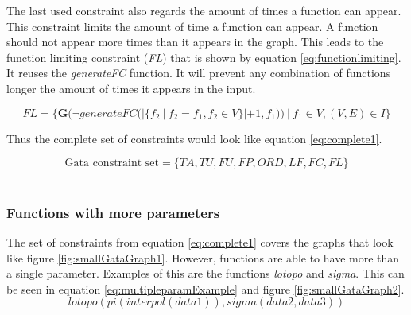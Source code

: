 \documentclass{article}
\begin{document}
The last used constraint also regards the amount of times a function can appear. This constraint limits the amount of time a function can appear. A function should not appear more times than it appears in the graph. This leads to the function limiting constraint (\textit{FL}) that is shown by equation \ref{eq:functionlimiting}. It reuses the \textit{generateFC} function. It will prevent any combination of functions longer the amount of times it appears in the input.

\begin{equation}
    FL = \{ \textbf{G}( \neg  generateFC(|\{ f_2\ |\ f_2 = f_1, f_2 \in V \}| +1, f_1))\ |\ f_1 \in V, (V,E) \in  I \} \label{eq:functionlimiting}
\end{equation}


Thus the complete set of constraints would look like equation \ref{eq:complete1}.

\begin{equation}
    \text{Gata constraint set}= \{TA, TU, FU, FP, ORD, LF, FC,FL\} \label{eq:complete1}
\end{equation}
 \\
 
 


\subsubsection{Functions with more parameters}

The set of constraints from equation \ref{eq:complete1} covers the graphs that look like figure \ref{fig:smallGataGraph1}. However, functions are able to have more than a single parameter. Examples of this are the functions \textit{lotopo} and \textit{sigma}. This can be seen in equation \ref{eq:multipleparamExample} and figure \ref{fig:smallGataGraph2}. 
\begin{equation}
lotopo(pi(interpol(data1)),sigma(data2,data3)) \label{eq:multipleparamExample}
\end{equation}
\end{document}
